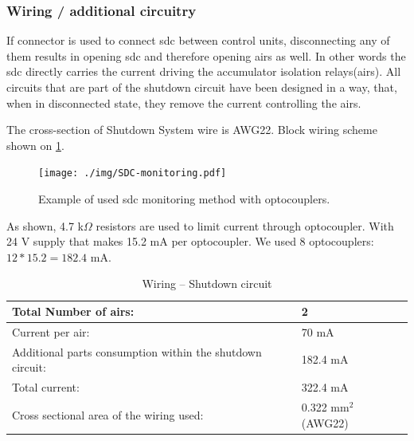 \subsubsection{Wiring / additional circuitry}

If connector is used to connect \gls{sdc} between control units, disconnecting any of them results in opening \gls{sdc} and therefore opening \glspl{air} as well. In other words the \gls{sdc} directly carries the current driving the accumulator isolation relays(\glspl{air}). All circuits that are part of the shutdown circuit have been designed in a way, that, when in disconnected state, they remove the current controlling the \glspl{air}.

The cross-section of Shutdown System wire is AWG22. Block wiring scheme shown on \ref{fig:SDC-schematic}.\\

\begin{figure}[H]
	\centering
	\texttt{[image: ./img/SDC-monitoring.pdf]}
	\caption{Example of used \gls{sdc} monitoring method with optocouplers.}
	\label{fig:SDC-schematic}
\end{figure}

As shown, 4.7 k$\Omega$ resistors are used to limit current through optocoupler. With 24 V supply that makes 15.2 mA per optocoupler. We used 8 optocouplers: $12*15.2= 182.4$ mA.
\begin{table}[H]
	\centering
	\caption{Wiring – Shutdown circuit}
	\begin{tabu}{|X|X|}
		\hline
		Total Number of \glspl{air}: & 2 \\
		\hline
		Current per \gls{air}: & 70 mA \\
		\hline
		Additional parts consumption within the shutdown circuit: & 182.4 mA \\
		\hline
		Total current: & 322.4 mA \\
		\hline
		Cross sectional area of the wiring used: & 0.322 mm$^2$ (AWG22) \\
		\hline
	\end{tabu}%
	\label{tab:SDC-Wiring}%
\end{table}%


